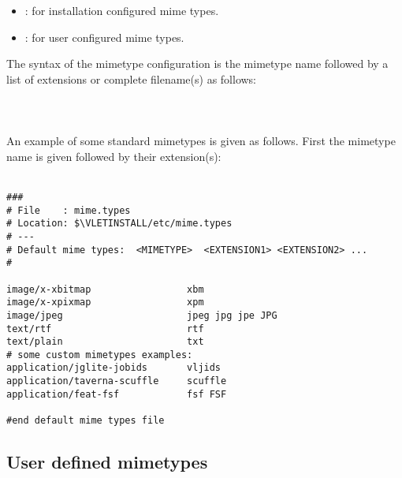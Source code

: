 \begin{itemize}
  \item {}: for installation configured mime
  types.
  \item {}: for user configured mime types.
\end{itemize}

The syntax of the mimetype configuration is the mimetype name followed by a list
of extensions or complete filename(s) as follows: \\
\\
\tab {}\\
\\
An example of some standard mimetypes is given as follows. First the
mimetype name is given followed by their extension(s):\\
\\
\begin{boxedlisting}[170]
\begin{verbatim}
###
# File    : mime.types
# Location: $\VLETINSTALL/etc/mime.types
# ---
# Default mime types:  <MIMETYPE>  <EXTENSION1> <EXTENSION2> ...
#

image/x-xbitmap                 xbm 
image/x-xpixmap                 xpm
image/jpeg                      jpeg jpg jpe JPG
text/rtf                        rtf
text/plain                      txt
# some custom mimetypes examples: 
application/jglite-jobids       vljids 
application/taverna-scuffle     scuffle
application/feat-fsf            fsf FSF 

#end default mime types file 
\end{verbatim}
\end{boxedlisting}

\subsection{User defined mimetypes}

